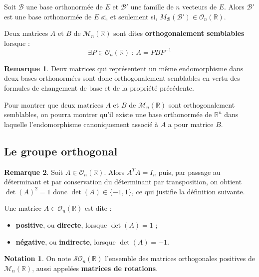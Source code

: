 \documentclass[french]{article}
\newcommand{\R}{\mathbb{R}}
\newcommand{\inv}{^{-1}}
\theoremstyle{plain}
\theoremstyle{definition}
\newtheorem*{rmq}{Remarque}
\newtheorem*{notation}{Notation}
\theoremstyle{remark}
\begin{document}
\begin{prop}
	Soit $\mathcal{B}$ une base orthonormée de $E$ et $\mathcal{B}'$ une famille de $n$ vecteurs de $E$. Alors $\mathcal{B}'$ est une base orthonormée de $E$ si, et seulement si, $M_\mathcal{B}(\mathcal{B}')\in\mathcal{O}_n(\R)$.
\end{prop}

\begin{dfn}
	Deux matrices $A$ et $B$ de $\mathcal{M}_n(\R)$ sont dites \textbf{orthogonalement semblables} lorsque : $$\exists P\in\mathcal{O}_n(\R)\ : \ A=PBP\inv$$
\end{dfn}

\begin{rmq}
	Deux matrices qui représentent un même endomorphisme dans deux bases orthonormées sont donc orthogonalement semblables en vertu des formules de changement de base et de la propriété précédente.
\end{rmq}

\begin{met}
	Pour montrer que deux matrices $A$ et $B$ de $\mathcal{M}_n(\R)$ sont orthogonalement semblables, on pourra montrer qu'il existe une base orthonormée de $\R^n$ dans laquelle l'endomorphisme canoniquement associé à $A$ a pour matrice $B$.
\end{met}

\subsection{Le groupe orthogonal}

\begin{rmq}
	Soit $A\in\mathcal{O}_n(\R)$. Alors $A^TA=I_n$ puis, par passage au déterminant et par conservation du déterminant par transposition, on obtient $\det(A)^2=1$ donc $\det(A)\in\{-1,1\}$, ce qui justifie la définition suivante.
\end{rmq}

\begin{dfn}
	Une matrice $A\in\mathcal{O}_n(\R)$ est dite :
	\begin{itemize}
		\item \textbf{positive}, ou \textbf{directe}, lorsque $\det(A)=1$ ;
		\item \textbf{négative}, ou \textbf{indirecte}, lorsque $\det(A)=-1$.
	\end{itemize}
\end{dfn}

\begin{notation}
	On note $\mathcal{SO}_n(\R)$ l'ensemble des matrices orthogonales positives de $\mathcal{M}_n(\R)$, aussi appelées \textbf{matrices de rotations}.
\end{notation}
\end{document}
